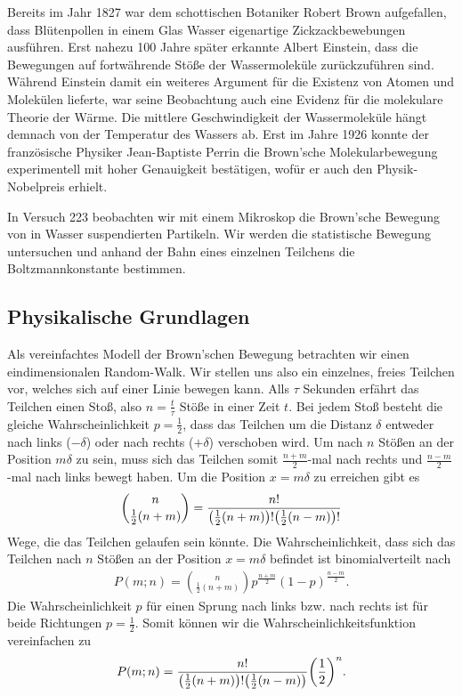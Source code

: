Bereits im Jahr 1827 war dem schottischen Botaniker Robert Brown aufgefallen, dass Blütenpollen in einem Glas Wasser eigenartige Zickzackbewebungen ausführen. Erst nahezu 100 Jahre später erkannte Albert Einstein, dass die Bewegungen auf fortwährende Stöße der Wassermoleküle zurückzuführen sind. Während Einstein damit ein weiteres Argument für die Existenz von Atomen und Molekülen lieferte, war seine Beobachtung auch eine Evidenz für die molekulare Theorie der Wärme. Die mittlere Geschwindigkeit der Wassermoleküle hängt demnach von der Temperatur des Wassers ab. Erst im Jahre 1926 konnte der französische Physiker Jean-Baptiste Perrin die Brown'sche Molekularbewegung experimentell mit hoher Genauigkeit bestätigen, wofür er auch den Physik-Nobelpreis erhielt.

In Versuch 223 beobachten wir mit einem Mikroskop die Brown'sche Bewegung von in Wasser suspendierten Partikeln. Wir werden die statistische Bewegung untersuchen und anhand der Bahn eines einzelnen Teilchens die Boltzmannkonstante bestimmen.

\subsection{Physikalische Grundlagen}

Als vereinfachtes Modell der Brown'schen Bewegung betrachten wir einen eindimensionalen Random-Walk. Wir stellen uns also ein einzelnes, freies Teilchen vor, welches sich auf einer Linie bewegen kann. Alls $\tau$ Sekunden erfährt das Teilchen einen Stoß, also $n = \frac{t}{\tau}$ Stöße in einer Zeit $t$. Bei jedem Stoß besteht die gleiche Wahrscheinlichkeit $p = \frac{1}{2}$, dass das Teilchen um die Distanz $\delta$ entweder nach links ($-\delta$) oder nach rechts ($+\delta$) verschoben wird. Um nach $n$ Stößen an der Position $m\delta$ zu sein, muss sich das Teilchen somit $\frac{n+m}{2}$-mal nach rechts und $\frac{n-m}{2}$-mal nach links bewegt haben. Um die Position $x = m\delta$ zu erreichen gibt es
\begin{align}
  \binom{n}{\frac{1}{2}(n+m)} = \frac{n!}{\qty(\frac{1}{2}(n+m))!\qty(\frac{1}{2}(n-m))!}
\end{align}
Wege, die das Teilchen gelaufen sein könnte. Die Wahrscheinlichkeit, dass sich das Teilchen nach $n$ Stößen an der Position $x = m\delta$ befindet ist binomialverteilt nach
\begin{align}
  P(m;n) = \binom{n}{\frac{1}{2}(n+m)} p^{\frac{n+m}{2}} (1-p)^{\frac{n-m}{2}}.
\end{align}
Die Wahrscheinlichkeit $p$ für einen Sprung nach links bzw. nach rechts ist für beide Richtungen $p = \frac{1}{2}$. Somit können wir die Wahrscheinlichkeitsfunktion vereinfachen zu
\begin{align}
  P(m;n) = \frac{n!}{\qty(\frac{1}{2}(n+m))!\qty(\frac{1}{2}(n-m))}\qty(\frac{1}{2})^n.
\end{align}

